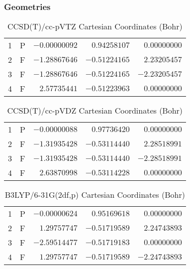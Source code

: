 \documentclass[10pt,oneside]{article}
\begin{document}
\clearpage

\subsection{\ \ \ }

\subsubsection*{Geometries}
\begin{table}[h!]
\centering
\caption{CCSD(T)/cc-pVTZ Cartesian Coordinates (Bohr)}
\begin{tabular}{llrrr}
1  & P  & $-0.00000092$ & $ 0.94258107$ & $ 0.00000000$ \\
2  & F  & $-1.28867646$ & $-0.51224165$ & $ 2.23205457$ \\
3  & F  & $-1.28867646$ & $-0.51224165$ & $-2.23205457$ \\
4  & F  & $ 2.57735441$ & $-0.51223963$ & $ 0.00000000$ \\
\end{tabular}
\end{table}

\begin{table}[h!]
\centering
\caption{CCSD(T)/cc-pVDZ Cartesian Coordinates (Bohr)}
\begin{tabular}{llrrr}
1  & P  & $-0.00000088$ & $ 0.97736420$ & $ 0.00000000$ \\
2  & F  & $-1.31935428$ & $-0.53114440$ & $ 2.28518991$ \\
3  & F  & $-1.31935428$ & $-0.53114440$ & $-2.28518991$ \\
4  & F  & $ 2.63870998$ & $-0.53114228$ & $ 0.00000000$ \\
\end{tabular}
\end{table}

\begin{table}[h!]
\centering
\caption{B3LYP/6-31G(2df,p) Cartesian Coordinates (Bohr)}
\begin{tabular}{llrrr}
1  & P  & $-0.00000624$ & $ 0.95169618$ & $ 0.00000000$ \\
2  & F  & $ 1.29757747$ & $-0.51719589$ & $ 2.24743893$ \\
3  & F  & $-2.59514477$ & $-0.51719183$ & $ 0.00000000$ \\
4  & F  & $ 1.29757747$ & $-0.51719589$ & $-2.24743893$ \\
\end{tabular}
\end{table}
\end{document}
